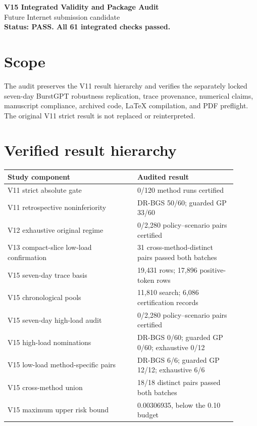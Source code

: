 \documentclass[11pt]{article}
\begin{document}
\begin{center}
{\Large\bfseries V15 Integrated Validity and Package Audit}\\[4pt]
Future Internet submission candidate\\[8pt]
{\bfseries Status: PASS. All 61 integrated checks passed.}
\end{center}

\section*{Scope}
The audit preserves the V11 result hierarchy and verifies the separately locked seven-day BurstGPT robustness replication, trace provenance, numerical claims, manuscript compliance, archived code, LaTeX compilation, and PDF preflight. The original V11 strict result is not replaced or reinterpreted.

\section*{Verified result hierarchy}
\begin{tabular}{p{0.51\linewidth}p{0.39\linewidth}}
\toprule
Study component & Audited result \\
\midrule
V11 strict absolute gate & 0/120 method runs certified \\
V11 retrospective noninferiority & DR-BGS 50/60; guarded GP 33/60 \\
V12 exhaustive original regime & 0/2,280 policy--scenario pairs certified \\
V13 compact-slice low-load confirmation & 31 cross-method-distinct pairs passed both batches \\
V15 seven-day trace basis & 19,431 rows; 17,896 positive-token rows \\
V15 chronological pools & 11,810 search; 6,086 certification records \\
V15 seven-day high-load audit & 0/2,280 policy--scenario pairs certified \\
V15 high-load nominations & DR-BGS 0/60; guarded GP 0/60; exhaustive 0/12 \\
V15 low-load method-specific pairs & DR-BGS 6/6; guarded GP 12/12; exhaustive 6/6 \\
V15 cross-method union & 18/18 distinct pairs passed both batches \\
V15 maximum upper risk bound & 0.00306935, below the 0.10 budget \\
\bottomrule
\end{tabular}
\end{document}
